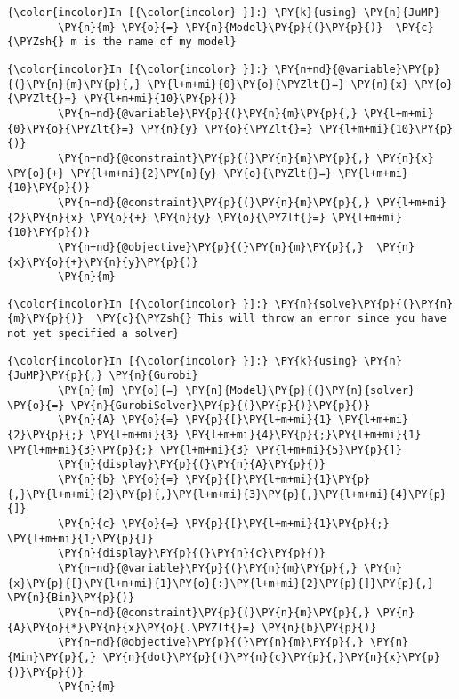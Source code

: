     \begin{Verbatim}[commandchars=\\\{\}]
{\color{incolor}In [{\color{incolor} }]:} \PY{k}{using} \PY{n}{JuMP}  
        \PY{n}{m} \PY{o}{=} \PY{n}{Model}\PY{p}{(}\PY{p}{)}  \PY{c}{\PYZsh{} m is the name of my model}
\end{Verbatim}


    \begin{Verbatim}[commandchars=\\\{\}]
{\color{incolor}In [{\color{incolor} }]:} \PY{n+nd}{@variable}\PY{p}{(}\PY{n}{m}\PY{p}{,} \PY{l+m+mi}{0}\PY{o}{\PYZlt{}=} \PY{n}{x} \PY{o}{\PYZlt{}=} \PY{l+m+mi}{10}\PY{p}{)}
        \PY{n+nd}{@variable}\PY{p}{(}\PY{n}{m}\PY{p}{,} \PY{l+m+mi}{0}\PY{o}{\PYZlt{}=} \PY{n}{y} \PY{o}{\PYZlt{}=} \PY{l+m+mi}{10}\PY{p}{)}
        \PY{n+nd}{@constraint}\PY{p}{(}\PY{n}{m}\PY{p}{,} \PY{n}{x} \PY{o}{+} \PY{l+m+mi}{2}\PY{n}{y} \PY{o}{\PYZlt{}=} \PY{l+m+mi}{10}\PY{p}{)}
        \PY{n+nd}{@constraint}\PY{p}{(}\PY{n}{m}\PY{p}{,} \PY{l+m+mi}{2}\PY{n}{x} \PY{o}{+} \PY{n}{y} \PY{o}{\PYZlt{}=} \PY{l+m+mi}{10}\PY{p}{)}
        \PY{n+nd}{@objective}\PY{p}{(}\PY{n}{m}\PY{p}{,}  \PY{n}{x}\PY{o}{+}\PY{n}{y}\PY{p}{)}
        \PY{n}{m}
\end{Verbatim}


    \begin{Verbatim}[commandchars=\\\{\}]
{\color{incolor}In [{\color{incolor} }]:} \PY{n}{solve}\PY{p}{(}\PY{n}{m}\PY{p}{)}  \PY{c}{\PYZsh{} This will throw an error since you have not yet specified a solver}
\end{Verbatim}


    \begin{Verbatim}[commandchars=\\\{\}]
{\color{incolor}In [{\color{incolor} }]:} \PY{k}{using} \PY{n}{JuMP}\PY{p}{,} \PY{n}{Gurobi}
        \PY{n}{m} \PY{o}{=} \PY{n}{Model}\PY{p}{(}\PY{n}{solver} \PY{o}{=} \PY{n}{GurobiSolver}\PY{p}{(}\PY{p}{)}\PY{p}{)}
        \PY{n}{A} \PY{o}{=} \PY{p}{[}\PY{l+m+mi}{1} \PY{l+m+mi}{2}\PY{p}{;} \PY{l+m+mi}{3} \PY{l+m+mi}{4}\PY{p}{;}\PY{l+m+mi}{1} \PY{l+m+mi}{3}\PY{p}{;} \PY{l+m+mi}{3} \PY{l+m+mi}{5}\PY{p}{]}
        \PY{n}{display}\PY{p}{(}\PY{n}{A}\PY{p}{)}
        \PY{n}{b} \PY{o}{=} \PY{p}{[}\PY{l+m+mi}{1}\PY{p}{,}\PY{l+m+mi}{2}\PY{p}{,}\PY{l+m+mi}{3}\PY{p}{,}\PY{l+m+mi}{4}\PY{p}{]}
        \PY{n}{c} \PY{o}{=} \PY{p}{[}\PY{l+m+mi}{1}\PY{p}{;} \PY{l+m+mi}{1}\PY{p}{]}
        \PY{n}{display}\PY{p}{(}\PY{n}{c}\PY{p}{)}
        \PY{n+nd}{@variable}\PY{p}{(}\PY{n}{m}\PY{p}{,} \PY{n}{x}\PY{p}{[}\PY{l+m+mi}{1}\PY{o}{:}\PY{l+m+mi}{2}\PY{p}{]}\PY{p}{,} \PY{n}{Bin}\PY{p}{)}
        \PY{n+nd}{@constraint}\PY{p}{(}\PY{n}{m}\PY{p}{,} \PY{n}{A}\PY{o}{*}\PY{n}{x}\PY{o}{.\PYZlt{}=} \PY{n}{b}\PY{p}{)}
        \PY{n+nd}{@objective}\PY{p}{(}\PY{n}{m}\PY{p}{,} \PY{n}{Min}\PY{p}{,} \PY{n}{dot}\PY{p}{(}\PY{n}{c}\PY{p}{,}\PY{n}{x}\PY{p}{)}\PY{p}{)}
        \PY{n}{m}
\end{Verbatim}


